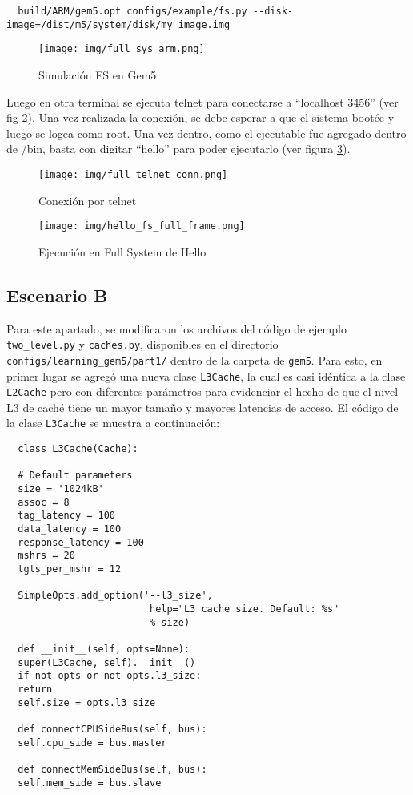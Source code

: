 \documentclass {article}
\begin{document}
\begin{lstlisting}
  build/ARM/gem5.opt configs/example/fs.py --disk-image=/dist/m5/system/disk/my_image.img
\end{lstlisting}

\begin{figure}[H]
  \centering
  \texttt{[image: img/full\_sys\_arm.png]}
  \caption{\label{fig:arm_full_gem5} Simulación FS en Gem5}
\end{figure}

Luego en otra terminal se ejecuta telnet para conectarse a ``localhost 3456'' (ver fig
\ref{fig:telnet}). Una vez realizada la
conexión, se debe esperar a que el sistema bootée y luego se logea como root. Una vez dentro, como
el ejecutable fue agregado dentro de /bin, basta con digitar ``hello'' para poder ejecutarlo (ver
figura \ref{fig:hello_fs}).

\begin{figure}[H]
  \centering
  \texttt{[image: img/full\_telnet\_conn.png]}
  \caption{\label{fig:telnet} Conexión por telnet}
\end{figure}

\begin{figure}[H]
  \centering
  \texttt{[image: img/hello\_fs\_full\_frame.png]}
  \caption{\label{fig:hello_fs} Ejecución en Full System de Hello}
\end{figure}

\subsection{Escenario B}
Para este apartado, se modificaron los archivos del código de ejemplo \texttt{two\_level.py} y
\texttt{caches.py}, disponibles en el directorio \texttt{configs/learning\_gem5/part1/} dentro de la
carpeta de \texttt{gem5}. Para esto, en primer lugar se agregó una nueva clase \texttt{L3Cache}, la
cual es casi idéntica a la clase \texttt{L2Cache} pero con diferentes parámetros para evidenciar el
hecho de que el nivel L3 de caché tiene un mayor tamaño y mayores latencias de acceso. El código de
la clase \texttt{L3Cache} se muestra a continuación:

\begin{lstlisting}
  class L3Cache(Cache):

  # Default parameters
  size = '1024kB'
  assoc = 8
  tag_latency = 100
  data_latency = 100
  response_latency = 100
  mshrs = 20
  tgts_per_mshr = 12

  SimpleOpts.add_option('--l3_size', 
                         help="L3 cache size. Default: %s" 
                         % size)

  def __init__(self, opts=None):
  super(L3Cache, self).__init__()
  if not opts or not opts.l3_size:
  return
  self.size = opts.l3_size

  def connectCPUSideBus(self, bus):
  self.cpu_side = bus.master

  def connectMemSideBus(self, bus):
  self.mem_side = bus.slave
\end{lstlisting}
\end{document}
